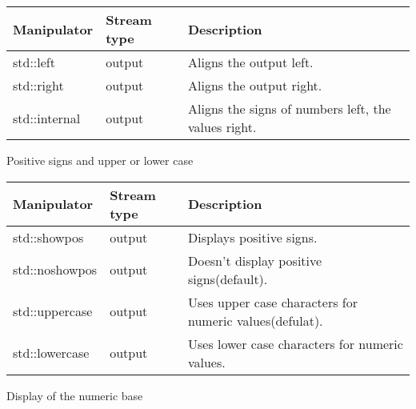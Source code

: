 \begin{longtable}[c]{|l|l|l|}
\hline
\textbf{Manipulator} & \textbf{Stream type} & \textbf{Description}                                \\ \hline
\endfirsthead
%
\endhead
%
std::left            & output               & Aligns the output left.                             \\ \hline
std::right           & output               & Aligns the output right.                            \\ \hline
std::internal        & output               & Aligns the signs of numbers left, the values right. \\ \hline
\end{longtable}

\begin{center}
Positive signs and upper or lower case
\end{center}


\begin{longtable}[c]{|l|l|l|}
\hline
\textbf{Manipulator} & \textbf{Stream type} & \textbf{Description}                                    \\ \hline
\endfirsthead
%
\endhead
%
std::showpos         & output               & Displays positive signs.                                \\ \hline
std::noshowpos       & output               & Doesn't display positive signs(default).                \\ \hline
std::uppercase       & output               & Uses upper case characters for numeric values(defulat). \\ \hline
std::lowercase       & output               & Uses lower case characters for numeric values.          \\ \hline
\end{longtable}


\begin{center}
Display of the numeric base
\end{center}

